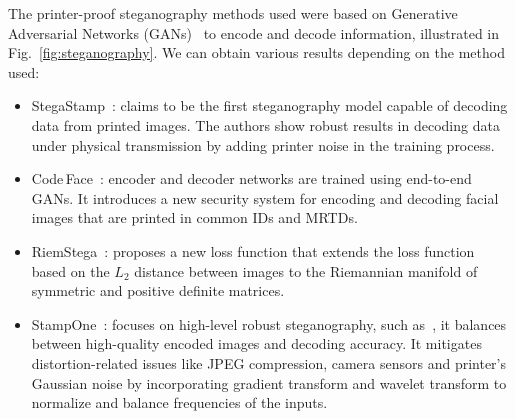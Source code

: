 The printer-proof steganography methods used were based on Generative Adversarial Networks (GANs)~\cite{gans2018} to encode and decode information, illustrated in Fig.~\ref{fig:steganography}. We can obtain various results depending on the method used:

\begin{itemize}
    \item StegaStamp~\cite{stegastamp2020}: claims to be the first steganography model capable of decoding data from printed images. The authors show robust results in decoding data under physical transmission by adding printer noise in the training process.
    \item Code\,Face~\cite{codeface2021}: encoder and decoder networks are trained using end-to-end GANs. It introduces a new security system for encoding and decoding facial images that are printed in common IDs and MRTDs.
    \item RiemStega~\cite{cruz2025riemstega}: proposes a new loss function that extends the loss function based on the $L_2$ distance between images to the Riemannian manifold of symmetric and positive definite matrices.
    \item StampOne~\cite{stampone2024}: focuses on high-level robust steganography, such as~\cite{codeface2021, stegastamp2020}, it balances between high-quality encoded images and decoding accuracy. It mitigates distortion-related issues like JPEG compression, camera sensors and printer's Gaussian noise by incorporating gradient transform and wavelet transform to normalize and balance frequencies of the inputs. 
\end{itemize}

